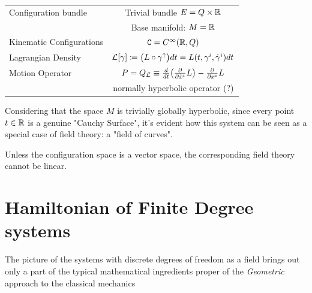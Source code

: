 \documentclass[Main]{subfiles}
\begin{document}
			\begin{center}\begin{tabular}{|l|c|}
			\hline
			Configuration bundle & Trivial bundle  $E= Q \times \mathbb{R}$\\
													& Base manifold: $M=\mathbb{R}$\\
			\hline
			Kinematic Configurations &  $\mathtt{C}=C^\infty(\mathbb{R},Q)$\\
			\hline
			Lagrangian Density		&	$\mathcal{L}  [\gamma] \coloneqq \big( L \circ	\gamma^\uparrow \big) dt  = L(t,\gamma^i,\dot{\gamma}^i) dt$\\
			\hline
			Motion Operator			&  $P=Q_{\mathcal{L}} \equiv \frac{d}{dt}\big(\frac{\partial}{\partial \dot{x}^i}L\big)-\frac{\partial}{\partial x^i}L $\\
													& normally hyperbolic operator (\danger ?)\\
			\hline
			\end{tabular}\end{center}
			
			Considering that the space $M$ is trivially globally hyperbolic, since every point $t\in\mathbb{R}$ is a genuine "Cauchy Surface", it's evident how this system can be seen as a special case of field theory: a "field of curves".
			\begin{observation}
				Unless the configuration space is a vector space, the corresponding field theory cannot be linear.
			\end{observation}		
		
	\section{Hamiltonian of Finite Degree systems}
		The picture of the systems with discrete degrees of freedom as a field brings out only a part of the typical mathematical ingredients proper of the \emph{Geometric} approach to the classical mechanics
\end{document}
